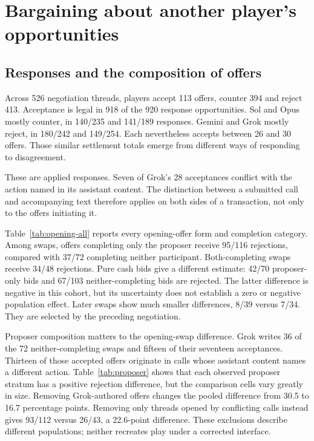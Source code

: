 \section{Bargaining about another player's opportunities}
\label{sec:bargaining}

\subsection{Responses and the composition of offers}
Across 526 negotiation threads, players accept 113 offers, counter 394 and reject 413. Acceptance is legal in 918 of the 920 response opportunities. Sol and Opus mostly counter, in 140/235 and 141/189 responses. Gemini and Grok mostly reject, in 180/242 and 149/254. Each nevertheless accepts between 26 and 30 offers. Those similar settlement totals emerge from different ways of responding to disagreement.

These are applied responses. Seven of Grok's 28 acceptances conflict with the action named in its assistant content. The distinction between a submitted call and accompanying text therefore applies on both sides of a transaction, not only to the offers initiating it.

Table~\ref{tab:opening-all} reports every opening-offer form and completion category. Among swaps, offers completing only the proposer receive 95/116 rejections, compared with 37/72 completing neither participant. Both-completing swaps receive 34/48 rejections. Pure cash bids give a different estimate: 42/70 proposer-only bids and 67/103 neither-completing bids are rejected. The latter difference is negative in this cohort, but its uncertainty does not establish a zero or negative population effect. Later swaps show much smaller differences, 8/39 versus 7/34. They are selected by the preceding negotiation.



Proposer composition matters to the opening-swap difference. Grok writes 36 of the 72 neither-completing swaps and fifteen of their seventeen acceptances. Thirteen of those accepted offers originate in calls whose assistant content names a different action. Table~\ref{tab:proposer} shows that each observed proposer stratum has a positive rejection difference, but the comparison cells vary greatly in size. Removing Grok-authored offers changes the pooled difference from 30.5 to 16.7 percentage points. Removing only threads opened by conflicting calls instead gives 93/112 versus 26/43, a 22.6-point difference. These exclusions describe different populations; neither recreates play under a corrected interface.

